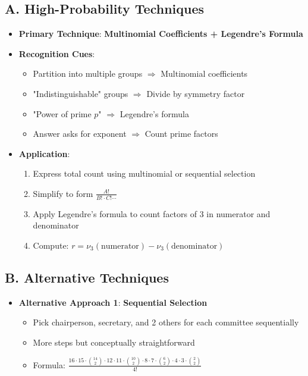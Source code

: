\documentclass[12pt]{article}
\begin{document}
\begin{techniquesbox}
\subsection*{A. High-Probability Techniques}
\begin{itemize}[leftmargin=*]
    \item \textbf{Primary Technique}: \textbf{Multinomial Coefficients + Legendre's Formula}
    
    \item \textbf{Recognition Cues}: 
    \begin{itemize}
        \item Partition into multiple groups $\Rightarrow$ Multinomial coefficients
        \item "Indistinguishable" groups $\Rightarrow$ Divide by symmetry factor
        \item "Power of prime $p$" $\Rightarrow$ Legendre's formula
        \item Answer asks for exponent $\Rightarrow$ Count prime factors
    \end{itemize}
    
    \item \textbf{Application}:
    \begin{enumerate}
        \item Express total count using multinomial or sequential selection
        \item Simplify to form $\frac{A!}{B! \cdot C! \cdots}$
        \item Apply Legendre's formula to count factors of 3 in numerator and denominator
        \item Compute: $r = \nu_3(\text{numerator}) - \nu_3(\text{denominator})$
    \end{enumerate}
\end{itemize}

\subsection*{B. Alternative Techniques}
\begin{itemize}[leftmargin=*]
    \item \textbf{Alternative Approach 1}: \textbf{Sequential Selection}
    \begin{itemize}
        \item Pick chairperson, secretary, and 2 others for each committee sequentially
        \item More steps but conceptually straightforward
        \item Formula: $\frac{16 \cdot 15 \cdot \binom{14}{2} \cdot 12 \cdot 11 \cdot \binom{10}{2} \cdot 8 \cdot 7 \cdot \binom{6}{2} \cdot 4 \cdot 3 \cdot \binom{2}{2}}{4!}$
    \end{itemize}
    

\end{itemize}
\end{techniquesbox}
\end{document}

